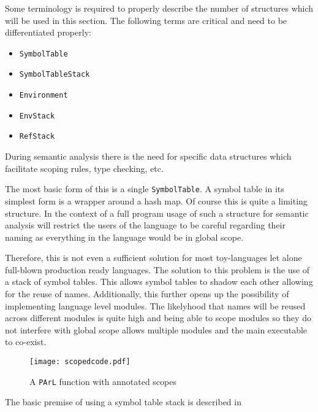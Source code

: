 Some terminology is required to properly describe the number of
structures which will be used in this section. The following
terms are critical and need to be differentiated properly:

\begin{itemize}
    \item \texttt{SymbolTable}
    \item \texttt{SymbolTableStack}
    \item \texttt{Environment}
    \item \texttt{EnvStack}
    \item \texttt{RefStack}
\end{itemize}

During semantic analysis there is the need for specific data
structures which facilitate scoping rules, type checking, etc.

The most basic form of this is a single \texttt{SymbolTable}. A
symbol table in its simplest form is a wrapper around a hash
map. Of course this is quite a limiting structure. In the
context of a full program usage of such a structure for semantic
analysis will restrict the users of the language to be careful
regarding their naming as everything in the language would be in
global scope.

Therefore, this is not even a sufficient solution for most
toy-languages let alone full-blown production ready languages.
The solution to this problem is the use of a stack of symbol
tables. This allows symbol tables to shadow each other allowing
for the reuse of names. Additionally, this further opens up the
possibility of implementing language level modules. The
likelyhood that names will be reused across different modules is
quite high and being able to scope modules so they do not
interfere with global scope allows multiple modules and the main
executable to co-exist.

\begin{figure}[H]
\centering
\texttt{[image: scopedcode.pdf]}
\caption{A \texttt{PArL} function with annotated scopes}
\label{fig:scopeannotatedcode}
\end{figure}

The basic premise of using a symbol table stack is described
in

